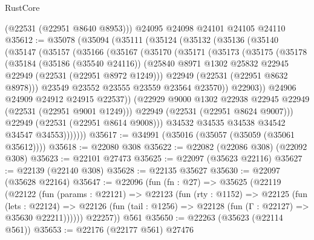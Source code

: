 \begin{lexlean}{RustCore}
\begin{coremodule}
      (@22531 (@22951 @8640 @8953)))
    @24095
    @24098
    @24101
    @24105
    @24110
@35612 := @35078
    (@35094
      (@35111
        (@35124
          (@35132
            (@35136
              (@35140
                (@35147
                  (@35157
                    (@35166
                      (@35167
                        (@35170
                          (@35171
                            (@35173
                              (@35175
                                (@35178
                                  (@35184
                                    (@35186 (@35540 @24116))
                                    (@25840
                                      @8971
                                      @1302
                                      @25832
                                      @22945
                                      @22949
                                      (@22531 (@22951 @8972 @1249)))
                                    @22949
                                    (@22531 (@22951 @8632 @8978)))
                                  @23549
                                  @23552
                                  @23555
                                  @23559
                                  @23564
                                  @23570))
                              @22903))
                          @24906
                          @24909
                          @24912
                          @24915
                          @22537))
                      (@22929 @9000 @1302 @22938 @22945 @22949 (@22531 (@22951 @9001 @1249)))
                      @22949
                      (@22531 (@22951 @8624 @9007)))
                    @22949
                    (@22531 (@22951 @8614 @9008)))
                  @34532
                  @34535
                  @34538
                  @34542
                  @34547
                  @34553)))))))
@35617 := @34991 (@35016 (@35057 (@35059 (@35061 @35612))))
@35618 := @22080 @308
@35622 := @22082 (@22086 @308) (@22092 @308)
@35623 := @22101 @27473
@35625 := @22097 (@35623 @22116)
@35627 := @22139 (@22140 @308)
@35628 := @22135 @35627
@35630 := @22097 (@35628 @22164)
@35647 := @22096
    (fun (fn : @27) =>
    @35625
      (@22119
        (@22122
          (fun (params : @22121) =>
          @22123
            (fun (rty : @1152) =>
            @22125
              (fun (lets : @22124) =>
              @22126 (fun (tail : @1256) => @22128 (fun (Γ : @22127) => @35630 @22211))))))
        @22257))
    @561
@35650 := @22263 (@35623 (@22114 @561))
@35653 := @22176 (@22177 @561) @27476

\end{coremodule}
\end{lexlean}
